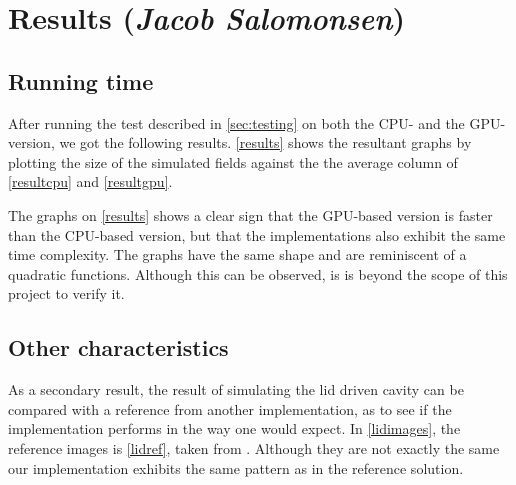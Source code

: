 \section{Results (\textit{Jacob Salomonsen})}

\subsection{Running time}\label{sec:runningtime}
After running the test described in \autoref{sec:testing} on both the CPU- and the GPU-version, we got the following results. \autoref{results} shows the resultant graphs by plotting the size of the simulated fields against the the average column of \autoref{resultcpu} and \autoref{resultgpu}.


The graphs on \autoref{results} shows a clear sign that the GPU-based version is faster than the CPU-based version, but that the implementations also exhibit the same time complexity. The graphs have the same shape and are reminiscent of a quadratic functions. Although this can be observed, is is beyond the scope of this project to verify it.



\subsection{Other characteristics}
As a secondary result, the result of simulating the lid driven cavity can be compared with a reference from another implementation, as to see if the implementation performs in the way one would expect. In \autoref{lidimages}, the reference images is \autoref{lidref}, taken from \cite{lidref}. Although they are not exactly the same our implementation exhibits the same pattern as in the reference solution.


